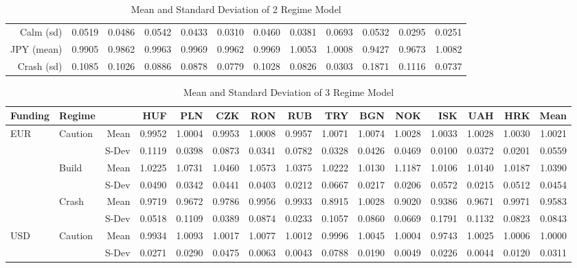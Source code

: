 \documentclass[12pt, a4paper, oneside]{article} %
\begin{document}
\begin{landscape}
\begin{table}[ht]
\begin{tabular}{rrrrrrrrrrrr}
  Calm (sd) & 0.0519 & 0.0486 & 0.0542 & 0.0433 & 0.0310 & 0.0460 & 0.0381 & 0.0693 & 0.0532 & 0.0295 & 0.0251 \\ 
  JPY (mean) & 0.9905 & 0.9862 & 0.9963 & 0.9969 & 0.9962 & 0.9969 & 1.0053 & 1.0008 & 0.9427 & 0.9673 & 1.0082 \\ 
  Crash (sd) & 0.1085 & 0.1026 & 0.0886 & 0.0878 & 0.0779 & 0.1028 & 0.0826 & 0.0303 & 0.1871 & 0.1116 & 0.0737 \\ 
   \hline
\end{tabular}
\caption{Mean and Standard Deviation of 2 Regime Model}
\label{tabref:2StateProb}
\end{table}
\end{landscape}

\begin{landscape}
\begin{table}[ht]
\caption{Mean and Standard Deviation of 3 Regime Model}
\centering
\begin{tabular}{llrrrrrrrrrrrrr}
  \hline
 Funding&Regime& & HUF & PLN & CZK & RON & RUB & TRY & BGN & NOK & ISK & UAH & HRK & Mean\\ 
 \hline
  \hline
\multirow{6}{*}{EUR}&\multirow{2}{*}{Caution}&Mean & 0.9952 & 1.0004 & 0.9953 & 1.0008 & 0.9957 & 1.0071 & 1.0074 & 1.0028 & 1.0033 & 1.0028 & 1.0030 & 1.0021\\ 
  &&S-Dev & 0.1119 & 0.0398 & 0.0873 & 0.0341 & 0.0782 & 0.0328 & 0.0426 & 0.0469 & 0.0100 & 0.0372 & 0.0201 & 0.0559\\ 
  & \multirow{2}{*}{Build} & Mean & 1.0225 & 1.0731 & 1.0460 & 1.0573 & 1.0375 & 1.0222 & 1.0130 & 1.1187 & 1.0106 & 1.0140 & 1.0187 &1.0390 \\
  && S-Dev & 0.0490 & 0.0342 & 0.0441 & 0.0403 & 0.0212 & 0.0667 & 0.0217 & 0.0206 & 0.0572 & 0.0215 & 0.0512 & 0.0454\\ 
  & \multirow{2}{*}{Crash} & Mean & 0.9719 & 0.9672 & 0.9786 & 0.9956 & 0.9933 & 0.8915 & 1.0028 & 0.9020 & 0.9386 & 0.9671 & 0.9971 & 0.9583\\ 
  && S-Dev & 0.0518 & 0.1109 & 0.0389 & 0.0874 & 0.0233 & 0.1057 & 0.0860 & 0.0669 & 0.1791 & 0.1132 & 0.0823 & 0.0843\\ 
\hline
\multirow{6}{*}{USD}& \multirow{2}{*}{Caution} & Mean   & 0.9934 & 1.0093 & 1.0017 & 1.0077 & 1.0012 & 0.9996 & 1.0045 & 1.0004 & 0.9743 & 1.0025 & 1.0006 & 1.0000\\ 
  && S-Dev & 0.0271 & 0.0290 & 0.0475 & 0.0063 & 0.0043 & 0.0788 & 0.0190 & 0.0049 & 0.0226 & 0.0044 & 0.0120 & 0.0311\\ 

\end{tabular}
\end{table}
\end{landscape}
\end{document}
